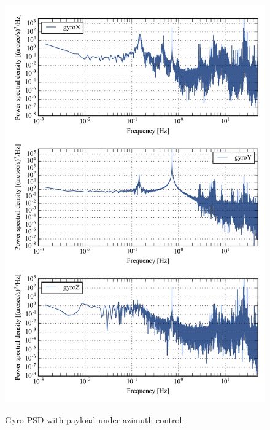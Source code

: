 \begin{figure}[!h]
\begin{center}
\includegraphics{Figures/multiPSD100.png}
\label{fig:multiPSD100_controlled}
\vspace{-0.5cm}
\caption[Gyro PSD with payload lifted, under azimuth control]{Gyro PSD with payload under azimuth control.}
\end{center}
\end{figure}

